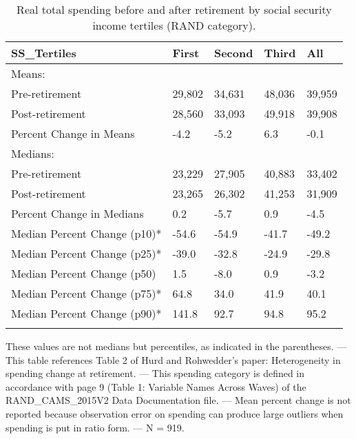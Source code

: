 \begin{table}[tbp] \centering
{}

\caption{Real total spending before and after retirement by social security income tertiles (RAND category).}
\begin{tabularx}{\textwidth}{lCCCC}

\toprule
{SS\_Tertiles}&{First}&{Second}&{Third}&{All} \tabularnewline
\midrule\addlinespace[1.5ex]
Means:&&&& \tabularnewline
\midrule Pre-retirement&29,802&34,631&48,036&39,959 \tabularnewline
Post-retirement&28,560&33,093&49,918&39,908 \tabularnewline
Percent Change in Means&-4.2&-5.2&6.3&-0.1 \tabularnewline
\midrule Medians:&&&& \tabularnewline
\midrule Pre-retirement&23,229&27,905&40,883&33,402 \tabularnewline
Post-retirement&23,265&26,302&41,253&31,909 \tabularnewline
Percent Change in Medians&0.2&-5.7&0.9&-4.5 \tabularnewline
Median Percent Change (p10)*&-54.6&-54.9&-41.7&-49.2 \tabularnewline
Median Percent Change (p25)*&-39.0&-32.8&-24.9&-29.8 \tabularnewline
Median Percent Change (p50)&1.5&-8.0&0.9&-3.2 \tabularnewline
Median Percent Change (p75)*&64.8&34.0&41.9&40.1 \tabularnewline
Median Percent Change (p90)*&141.8&92.7&94.8&95.2 \tabularnewline
\bottomrule \addlinespace[1.5ex]

\end{tabularx}
\begin{flushleft}
\footnotesize *These values are not medians but percentiles, as indicated in the parentheses. \linebreak --- \linebreak This table references Table 2 of Hurd and Rohwedder's paper: Heterogeneity in spending change at retirement. \linebreak --- \linebreak This spending category is defined in accordance with page 9 (Table 1: Variable Names Across Waves) of the RAND\_CAMS\_2015V2 Data Documentation file. \linebreak --- \linebreak Mean percent change is not reported because observation error on spending can produce large outliers when spending is put in ratio form. \linebreak --- \linebreak N = 919.
\end{flushleft}
\end{table}

